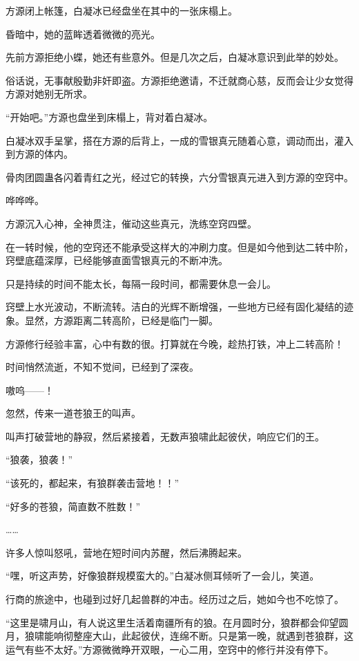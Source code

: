\begin{this_body}
方源闭上帐篷，白凝冰已经盘坐在其中的一张床榻上。

昏暗中，她的蓝眸透着微微的亮光。

先前方源拒绝小蝶，她还有些意外。但是几次之后，白凝冰意识到此举的妙处。

俗话说，无事献殷勤非奸即盗。方源拒绝邀请，不迁就商心慈，反而会让少女觉得方源对她别无所求。

“开始吧。”方源也盘坐到床榻上，背对着白凝冰。

白凝冰双手呈掌，搭在方源的后背上，一成的雪银真元随着心意，调动而出，灌入到方源的体内。

骨肉团圆蛊各闪着青红之光，经过它的转换，六分雪银真元进入到方源的空窍中。

哗哗哗。

方源沉入心神，全神贯注，催动这些真元，洗练空窍四壁。

在一转时候，他的空窍还不能承受这样大的冲刷力度。但是如今他到达二转中阶，窍壁底蕴深厚，已经能够直面雪银真元的不断冲洗。

只是持续的时间不能太长，每隔一段时间，都需要休息一会儿。

窍壁上水光波动，不断流转。洁白的光辉不断增强，一些地方已经有固化凝结的迹象。显然，方源距离二转高阶，已经是临门一脚。

方源修行经验丰富，心中有数的很。打算就在今晚，趁热打铁，冲上二转高阶！

时间悄然流逝，不知不觉间，已经到了深夜。

嗷呜——！

忽然，传来一道苍狼王的叫声。

叫声打破营地的静寂，然后紧接着，无数声狼啸此起彼伏，响应它们的王。

“狼袭，狼袭！”

“该死的，都起来，有狼群袭击营地！！”

“好多的苍狼，简直数不胜数！”

……

许多人惊叫怒吼，营地在短时间内苏醒，然后沸腾起来。

“嘿，听这声势，好像狼群规模蛮大的。”白凝冰侧耳倾听了一会儿，笑道。

行商的旅途中，也碰到过好几起兽群的冲击。经历过之后，她如今也不吃惊了。

“这里是啸月山，有人说这里生活着南疆所有的狼。在月圆时分，狼群都会仰望圆月，狼啸能响彻整座大山，此起彼伏，连绵不断。只是第一晚，就遇到苍狼群，这运气有些不太好。”方源微微睁开双眼，一心二用，空窍中的修行并没有停下。


\end{this_body}
